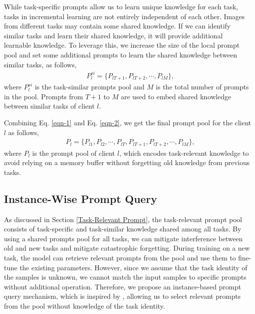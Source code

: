 \documentclass[sigconf,anonymous,review,screen]{acmart}
\begin{document}
While task-specific prompts allow us to learn unique knowledge for each task, tasks in incremental learning are not entirely independent of each other. Images from different tasks may contain some shared knowledge. If we can identify similar tasks and learn their shared knowledge, it will provide additional learnable knowledge. To leverage this, we increase the size of the local prompt pool and set some additional prompts to learn the shared knowledge between similar tasks, as follows,
\begin{equation}\label{eqn-2}
	\begin{aligned}
		&P_l^{si} = \{P_{lT+1}, P_{lT+2}, \cdots, P_{lM} \},
	\end{aligned}
\end{equation}
where $P^{si}_l$ is the task-similar prompts pool and $M$ is the total number of prompts in the pool. Prompts from $T+1$ to $M$ are used to embed shared knowledge between similar tasks of client $l$.

Combining Eq. \ref{eqn-1} and Eq. \ref{eqn-2}, we get the final prompt pool for the client $l$ as follows,
\begin{equation}\label{eqn-3}
	\begin{aligned}
		&P_l = \{P_{l1}, P_{l2}, \cdots, P_{lT}, P_{lT+1}, P_{lT+2}, \cdots, P_{lM} \},
	\end{aligned}
\end{equation}
where $P_l$ is the prompt pool of client $l$, which encodes task-relevant knowledge to avoid relying on a memory buffer without forgetting old knowledge from previous tasks. 

\subsection{Instance-Wise Prompt Query}\label{Instance-Wise Prompt Query}
As discussed in Section \ref{Task-Relevant Prompt}, the task-relevant prompt pool consists of task-specific and task-similar knowledge shared among all tasks. By using a shared prompts pool for all tasks, we can mitigate interference between old and new tasks and mitigate catastrophic forgetting. During training on a new task, the model can retrieve relevant prompts from the pool and use them to fine-tune the existing parameters. However, since we assume that the task identity of the samples is unknown, we cannot match the input samples to specific prompts without additional operation. Therefore, we propose an instance-based prompt query mechanism, which is inspired by \cite{wang2022learning}, allowing us to select relevant prompts from the pool without knowledge of the task identity.
\end{document}
